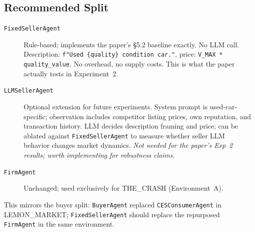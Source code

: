 \documentclass{article}
\begin{document}
\subsection{Recommended Split}

\begin{description}
  \item[\texttt{FixedSellerAgent}] Rule-based; implements the paper's §5.2 baseline exactly.
    No LLM call. Description: \texttt{f"Used \{quality\} condition car."}, price:
    \texttt{V\_MAX * quality\_value}. No overhead, no supply costs. This is what the paper
    actually tests in Experiment~2.
  \item[\texttt{LLMSellerAgent}] Optional extension for future experiments. System prompt is
    used-car-specific; observation includes competitor listing prices, own reputation, and
    transaction history. LLM decides description framing and price; can be ablated
    against \texttt{FixedSellerAgent} to measure whether seller LLM behavior changes
    market dynamics. \emph{Not needed for the paper's Exp~2 results; worth implementing
    for robustness claims.}
  \item[\texttt{FirmAgent}] Unchanged; used exclusively for THE\_CRASH (Environment~A).
\end{description}

This mirrors the buyer split: \texttt{BuyerAgent} replaced \texttt{CESConsumerAgent} in
LEMON\_MARKET; \texttt{FixedSellerAgent} should replace the repurposed \texttt{FirmAgent} in
the same environment.
\end{document}
